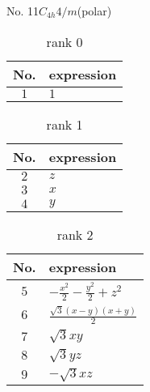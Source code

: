 \documentclass[fleqn,8pt,landscape]{jsarticle}
\begin{document}
\setcounter{MaxMatrixCols}{16}

\begin{center}
\LARGE
No. 11\quad$C_{4h}$\quad$4/m$\quad[ tetragonal ] (polar)
\end{center}
\begin{table}[ht!]
\begin{center}
\caption{rank 0}
\renewcommand{\arraystretch}{1.3}
\begin{tabular}{cl} \hline \hline
No. & expression \\ \hline
$ 1 $ & $ 1 $ \\
 \hline \hline
\end{tabular}
\end{center}
\end{table}
\begin{table}[ht!]
\begin{center}
\caption{rank 1}
\renewcommand{\arraystretch}{1.3}
\begin{tabular}{cl} \hline \hline
No. & expression \\ \hline
$ 2 $ & $ z $ \\
$ 3 $ & $ x $ \\
$ 4 $ & $ y $ \\
 \hline \hline
\end{tabular}
\end{center}
\end{table}
\begin{table}[ht!]
\begin{center}
\caption{rank 2}
\renewcommand{\arraystretch}{1.3}
\begin{tabular}{cl} \hline \hline
No. & expression \\ \hline
$ 5 $ & $ - \frac{x^{2}}{2} - \frac{y^{2}}{2} + z^{2} $ \\
$ 6 $ & $ \frac{\sqrt{3} \left(x - y\right) \left(x + y\right)}{2} $ \\
$ 7 $ & $ \sqrt{3} x y $ \\
$ 8 $ & $ \sqrt{3} y z $ \\
$ 9 $ & $ - \sqrt{3} x z $ \\
 \hline \hline
\end{tabular}
\end{center}
\end{table}
\end{document}
